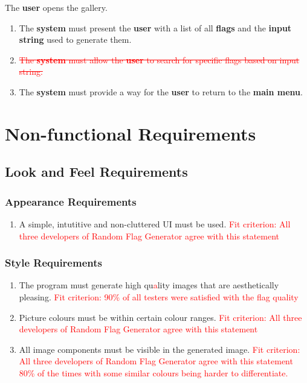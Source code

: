 \documentclass[12pt, titlepage]{article}
\begin{document}
\begin{enumerate}[label=BE\arabic*.]
    \begin{item}
        The \textbf{user} opens the gallery.
        \begin{enumerate}[label=FR\arabic*., resume*=frs]
            \item The \textbf{system} must present the \textbf{user} with a list of all \textbf{flags} and the \textbf{input string} used to generate them.

            \item \textcolor{red}{\sout{The \textbf{system} must allow the \textbf{user} to search for specific flags based on input string.}}

            \item The \textbf{system} must provide a way for the \textbf{user} to return to the \textbf{main menu}.
        \end{enumerate}
    \end{item}
\end{enumerate}

\section{Non-functional Requirements}

\subsection{Look and Feel Requirements}

\subsubsection{Appearance Requirements}
\begin{enumerate}[label=LF\arabic*., series=lfs]
    \item A simple, intutitive and non-cluttered UI must be used. \textcolor{red}{Fit criterion: All three developers of Random Flag Generator agree with this statement}
\end{enumerate}

\subsubsection{Style Requirements} 
\begin{enumerate}[label=LF\arabic*., resume=lfs]
    \item The program must generate high qu\textcolor{red}{a}lity images that are aesthetically pleasing. \textcolor{red}{Fit criterion: 90\% of all testers were satisfied with the flag quality}
    \item Picture colours must be within certain colour ranges. \textcolor{red}{Fit criterion: All three developers of Random Flag Generator agree with this statement}
    \item All image components must be visible in the generated image. \textcolor{red}{Fit criterion: All three developers of Random Flag Generator agree with this statement 80\% of the times with some similar colours being harder to differentiate.}
\end{enumerate}
\end{document}
